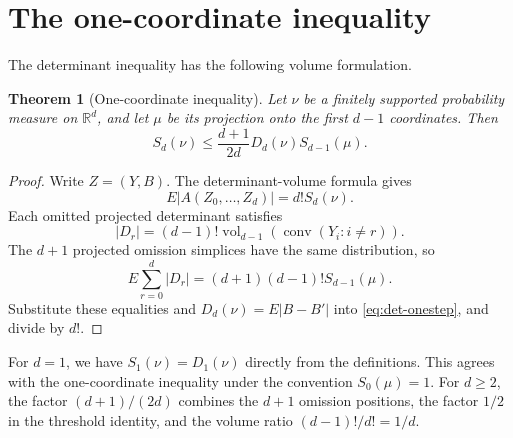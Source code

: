 \documentclass[11pt]{article}
\newtheorem{theorem}{Theorem}[section]
\theoremstyle{remark}
\newcommand{\R}{\mathbb{R}}
\newcommand{\E}{E}
\newcommand{\vol}{\operatorname{vol}}
\newcommand{\conv}{\operatorname{conv}}
\begin{document}
\section{The one-coordinate inequality}
\label{sec:onestep}
\begin{aiblock}




The determinant inequality has the following volume formulation.

\begin{theorem}[One-coordinate inequality]
\label{thm:onestep}
Let $\nu$ be a finitely supported probability measure on $\R^d$, and
let $\mu$ be its projection onto the first $d-1$ coordinates. Then
\begin{equation}
S_d(\nu)\leq\frac{d+1}{2d}D_d(\nu)S_{d-1}(\mu).
\end{equation}
\end{theorem}

\begin{proof}
Write $Z=(Y,B)$. The determinant-volume formula gives
\begin{equation}
\E|A(Z_0,\ldots,Z_d)|=d!S_d(\nu).
\end{equation}
Each omitted projected determinant satisfies
\begin{equation}
|D_r|=(d-1)!\vol_{d-1}(\conv(Y_i:i\neq r)).
\end{equation}
The $d+1$ projected omission simplices have the same distribution, so
\begin{equation}
\E\sum_{r=0}^d|D_r|=(d+1)(d-1)!S_{d-1}(\mu).
\end{equation}
Substitute these equalities and $D_d(\nu)=\E|B-B'|$ into
\eqref{eq:det-onestep}, and divide by $d!$.
\end{proof}

For $d=1$, we have $S_1(\nu)=D_1(\nu)$ directly from the definitions. This agrees with the one-coordinate inequality under the convention $S_0(\mu)=1$. For $d\geq2$, the factor $(d+1)/(2d)$ combines the $d+1$ omission positions, the factor $1/2$ in the threshold identity, and the volume ratio $(d-1)!/d!=1/d$.



\end{aiblock}
\end{document}

